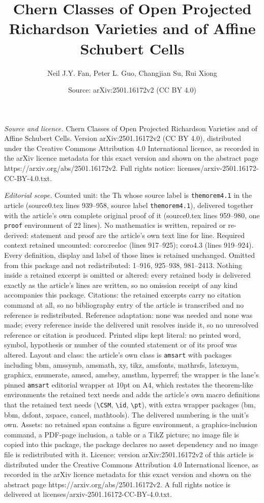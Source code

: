 \documentclass[10pt,a4paper]{amsart}
\title[Chern Classes of Open Projected Richardson Varieties and of ]{Chern Classes of Open Projected Richardson Varieties and of Affine Schubert Cells}
\author{Neil J.Y. Fan, Peter L. Guo, Changjian Su, Rui Xiong}
\date{Source: arXiv:2501.16172v2 (CC BY 4.0)}
\begin{document}
\maketitle

\noindent\emph{Source and licence.} Chern Classes of Open Projected Richardson Varieties and of Affine Schubert Cells. Version arXiv:2501.16172v2 (CC BY 4.0), distributed under the Creative Commons Attribution 4.0 International licence, as recorded in the arXiv licence metadata for this exact version and shown on the abstract page https://arxiv.org/abs/2501.16172v2. Full rights notice: licenses/arxiv-2501.16172-CC-BY-4.0.txt.\par\smallskip

\noindent\textit{Editorial scope.} Counted unit: the Th whose source label is \texttt{themorem4.1} in the article (source0.tex lines 939--958, source label \texttt{themorem4.1}), delivered together with the article's own complete original proof of it (source0.tex lines 959--980, one \texttt{proof} environment of 22 lines). No mathematics is written, repaired or re-derived: statement and proof are the article's own text line for line. Required context retained uncounted: coro:recloc (lines 917--925); coro4.3 (lines 919--924). Every definition, display and label of those lines is retained unchanged. Omitted from this package and not redistributed: 1--916, 925--938, 981--2413. Nothing inside a retained excerpt is omitted or altered: every retained body is delivered exactly as the article's lines are written, so no omission receipt of any kind accompanies this package. Citations: the retained excerpts carry no citation command at all, so no bibliography entry of the article is transcribed and no reference is redistributed. Reference adaptation: none was needed and none was made; every reference inside the delivered unit resolves inside it, so no unresolved reference or citation is produced. Printed slips kept literal: no printed word, symbol, hypothesis or number of the counted statement or of its proof was altered. Layout and class: the article's own class is \texttt{amsart} with packages including bbm, amssymb, amsmath, xy, tikz, amsfonts, mathrsfs, latexsym, graphicx, enumerate, amscd, amsbsy, amsthm, hyperref; the wrapper is the lane's pinned \texttt{amsart} editorial wrapper at 10pt on A4, which restates the theorem-like environments the retained text needs and adds the article's own macro definitions that the retained text needs (\texttt{\textbackslash CSM}, \texttt{\textbackslash id}, \texttt{\textbackslash pt}), with extra wrapper packages (bm, bbm, dsfont, xspace, cancel, mathtools). The delivered numbering is the unit's own. Assets: no retained span contains a figure environment, a graphics-inclusion command, a PDF-page inclusion, a table or a TikZ picture; no image file is copied into this package, the package declares no asset dependency and no image file is redistributed with it. Licence: version arXiv:2501.16172v2 of this article is distributed under the Creative Commons Attribution 4.0 International licence, as recorded in the arXiv licence metadata for this exact version and shown on the abstract page https://arxiv.org/abs/2501.16172v2. A full rights notice is delivered at licenses/arxiv-2501.16172-CC-BY-4.0.txt. 
\end{document}
